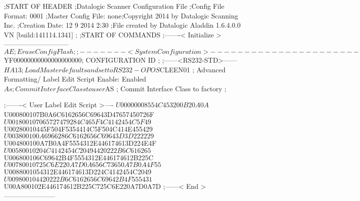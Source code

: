 ;START OF HEADER
;Datalogic Scanner Configuration File
;Config File Format: 0001
;Master Config File: none;Copyright 2014 by Datalogic Scanning Inc.
;Creation Date: 12 9 2014 2:30
;File created by Datalogic Aladdin 1.6.4.0.0 VN [build:141114.1341]
;
;START OF COMMANDS
;-------< Initialize >-----------------------------
$AE                 ; Erase Config Flash
;
;-------< System Configuration >-------------------------------
$YF00000000000000000000; CONFIGURATION ID
;
;------<RS232-STD>------
$HA13               ; Load Master defaults and set to RS232-OPOS
$CLEEN01            ; Advanced Formatting/ Label Edit Script Enable: Enabled
$As                 ; Commit Interface Class to user
$AS                 ; Commit Interface Class to factory
;

;-------< User Label Edit Script >----
$U00000008554C453200B20A0A
$U000800107B0A6C6162656C69643D47657450726F
$U001800107065727479284C465F4C4142454C5F49
$U00280010445F504F5354414C5F504C414E455429
$U003800100A6966286C6162656C69643D3D222229
$U004800100A7B0A4F5554312E446174613D224E4F
$U00580010204C4142454C20494420222B6C616265
$U006800106C69642B4F5554312E446174612B225C
$U00780010725C6E220A7D0A656C73650A7B0A4F55
$U0088001054312E446174613D224C4142454C2049
$U009800104420222B6C6162656C69642B4F555431
$U00A800102E446174612B225C725C6E220A7D0A7D
;------< End >-----------------------
